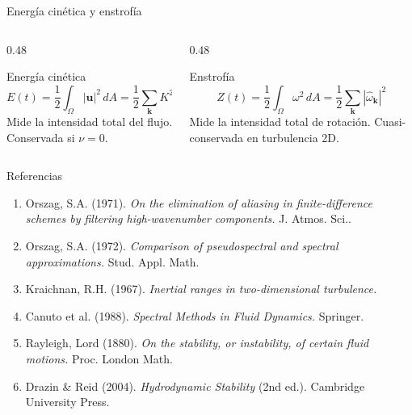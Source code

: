 \documentclass[aspectratio=169, 12pt]{beamer}
\newcommand{\uv}{\mathbf{u}}
\begin{document}
\begin{frame}{Energía cinética y enstrofía}
  \begin{columns}
    \begin{column}{0.48\textwidth}
      \begin{block}{Energía cinética}
        \[
          E(t) = \frac{1}{2}\int_\Omega |\uv|^2\,dA
               = \frac{1}{2}\sum_\mathbf{k} K^2|\hat{\psi}_\mathbf{k}|^2
        \]
        Mide la intensidad total del flujo.
        Conservada si $\nu = 0$.
      \end{block}
    \end{column}
    \begin{column}{0.48\textwidth}
      \begin{block}{Enstrofía}
        \[
          Z(t) = \frac{1}{2}\int_\Omega \omega^2\,dA
               = \frac{1}{2}\sum_\mathbf{k} |\hat{\omega}_\mathbf{k}|^2
        \]
        Mide la intensidad total de rotación.
        Cuasi-conservada en turbulencia 2D.
      \end{block}
    \end{column}
  \end{columns}

  \vspace{0.5em}

\end{frame}



\begin{frame}{Referencias}
  \begin{enumerate}
    \item Orszag, S.A. (1971). \textit{On the elimination of aliasing
          in finite-difference schemes by filtering high-wavenumber
          components.} J. Atmos. Sci..

    \item Orszag, S.A. (1972). \textit{Comparison of pseudospectral
          and spectral approximations.} Stud. Appl. Math.
        

    \item Kraichnan, R.H. (1967). \textit{Inertial ranges in
          two-dimensional turbulence.} 

    \item Canuto et al. (1988). \textit{Spectral Methods in Fluid Dynamics.} Springer.

    \item Rayleigh, Lord (1880). \textit{On the stability, or
          instability, of certain fluid motions.}
          Proc. London Math. 

    \item Drazin \& Reid (2004). \textit{Hydrodynamic Stability}
          (2nd ed.). Cambridge University Press.
  \end{enumerate}
\end{frame}
\end{document}

